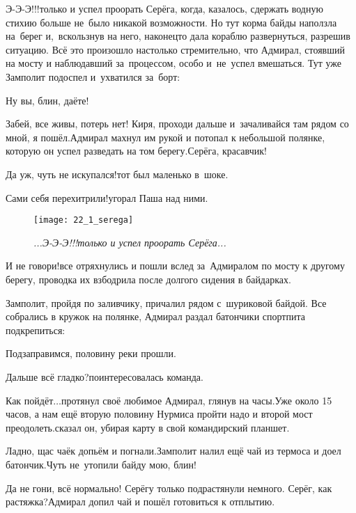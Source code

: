 \diagdash Э-Э-Э!!!\mdash только и успел проорать Серёга, когда, казалось, сдержать водную стихию больше не~было никакой возможности. Но тут корма байды наползла на~берег и,~вскользнув на него, наконец\sdash то дала кораблю развернуться, разрешив ситуацию. Всё это произошло настолько стремительно, что Адмирал, стоявший на мосту и наблюдавший за~процессом, особо и~не~успел вмешаться. Тут уже Замполит подоспел и~ухватился за~борт:

\diagdash Ну вы, блин, даёте!

\diagdash Забей, все живы, потерь нет! Киря, проходи дальше и~зачаливайся там рядом со мной, я пошёл.\mdash Адмирал махнул им рукой и потопал к небольшой полянке, которую он успел разведать на том берегу.\mdash Серёга, красавчик!

\diagdash Да уж, чуть не искупался!\mdash тот был маленько в~шоке.

\diagdash Сами себя перехитрили!\mdash угорал Паша над ними.

\setlength{\belowcaptionskip}{-20pt}
\begin{figure}[h]
	\centering
	\texttt{[image: 22\_1\_serega]}
	\caption{\small\textit{...Э-Э-Э!!!\mdash только и успел проорать Серёга...}}
\end{figure}

\diagdash И не говори!\mdash все отряхнулись и пошли вслед за~Адмиралом по мосту к другому берегу, проводка их взбодрила после долгого сидения в байдарках.

Замполит, пройдя по заливчику, причалил рядом с~шуриковой байдой. Все собрались в кружок на полянке, Адмирал раздал батончики спортпита подкрепиться:

\diagdash Подзаправимся, половину реки прошли.

\diagdash Дальше всё гладко?\mdash поинтересовалась команда.

\renewcommand*{\thefootnote}{\fnsymbol{footnote}}
\setcounter{footnote}{0}
\diagdash Как пойдёт$\ldots$\mdash протянул своё любимое Адмирал, глянув на часы.\mdash Уже около 15 часов, а нам ещё вторую половину Нурмиса пройти надо и второй мост преодолеть.\mdash сказал он, убирая карту в свой командирский планшет.

\diagdash Ладно, щас чаёк допьём и погнали.\mdash Замполит налил ещё чай из термоса и доел батончик.\mdash Чуть не~утопили байду мою, блин!

\diagdash Да не гони, всё нормально! Серёгу только подрастянули немного. Серёг, как растяжка?\mdash Адмирал допил чай и пошёл готовиться к отплытию.

